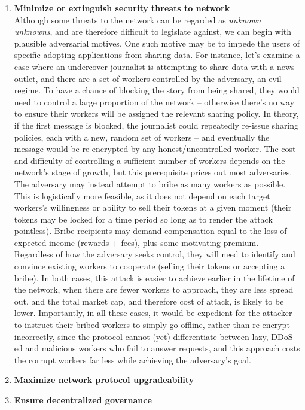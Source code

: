\documentclass[11pt]{amsart}
\begin{document}
\begin{enumerate}
   \\
   \item \textbf{Minimize or extinguish security threats to network}\label{threats}
   \\
   Although some threats to the network can be regarded as \textit{unknown unknowns}, and are therefore difficult to legislate against, we can begin with plausible adversarial motives. One such motive may be to impede the users of specific adopting applications from sharing data. For instance, let's examine a case where an undercover journalist is attempting to share data with a news outlet, and there are a set of workers controlled by the adversary, an evil regime. To have a chance of blocking the story from being shared, they would need to control a large proportion of the network – otherwise there’s no way to ensure their workers will be assigned the relevant sharing policy. In theory, if the first message is blocked, the journalist could repeatedly re-issue sharing policies, each with a new, random set of workers – and eventually the message would be re-encrypted by any honest/uncontrolled worker. The cost and difficulty of controlling a sufficient number of workers depends on the network’s stage of growth, but this prerequisite prices out most adversaries. The adversary may instead attempt to bribe as many workers as possible. This is logistically more feasible, as it does not depend on each target workers’s willingness or ability to sell their tokens at a given moment (their tokens may be locked for a time period so long as to render the attack pointless). Bribe recipients may demand compensation equal to the loss of expected income (rewards + fees), plus some motivating premium.
   \\
   Regardless of how the adversary seeks control, they will need to identify and convince existing workers to cooperate (selling their tokens or accepting a bribe). In both cases, this attack is easier to achieve earlier in the lifetime of the network, when there are fewer workers to approach, they are less spread out, and the total market cap, and therefore cost of attack, is likely to be lower. Importantly, in all these cases, it would be expedient for the attacker to instruct their bribed workers to simply go offline, rather than re-encrypt incorrectly, since the protocol cannot (yet) differentiate between lazy, DDoS-ed and malicious workers who fail to answer requests, and this approach costs the corrupt workers far less while achieving the adversary's goal.
   \\
   \item \textbf{Maximize network protocol upgradeability}\label{upgrade}
   \\
   \item \textbf{Ensure decentralized governance}\label{gov}
\end{enumerate}
\end{document}
